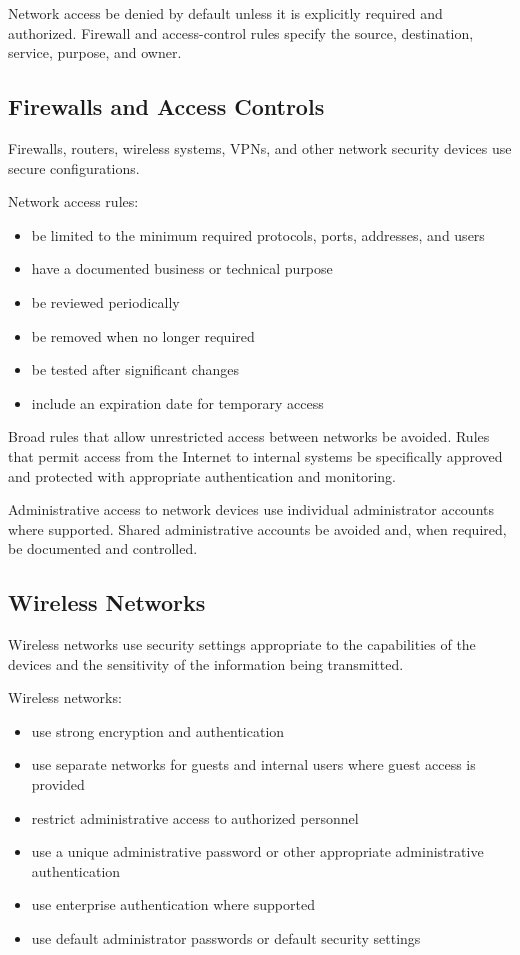 Network access \must{} be denied by default unless it is explicitly required and authorized. Firewall and access-control rules \must{} specify the source, destination, service, purpose, and owner.

\subsection{Firewalls and Access Controls}

Firewalls, routers, wireless systems, VPNs, and other network security devices \must{} use secure configurations.

Network access rules:
\begin{itemize}
    \item \must{} be limited to the minimum required protocols, ports, addresses, and users
    \item \must{} have a documented business or technical purpose
    \item \must{} be reviewed periodically
    \item \must{} be removed when no longer required
    \item \must{} be tested after significant changes
    \item \should{} include an expiration date for temporary access
\end{itemize}

Broad rules that allow unrestricted access between networks \should{} be avoided. Rules that permit access from the Internet to internal systems \must{} be specifically approved and protected with appropriate authentication and monitoring.

Administrative access to network devices \must{} use individual administrator accounts where supported. Shared administrative accounts \should{} be avoided and, when required, \must{} be documented and controlled.

\subsection{Wireless Networks}

Wireless networks \must{} use security settings appropriate to the capabilities of the devices and the sensitivity of the information being transmitted.

Wireless networks:
\begin{itemize}
    \item \must{} use strong encryption and authentication
    \item \must{} use separate networks for guests and internal users where guest access is provided
    \item \must{} restrict administrative access to authorized personnel
    \item \must{} use a unique administrative password or other appropriate administrative authentication
    \item \should{} use enterprise authentication where supported
    \item \mustnot{} use default administrator passwords or default security settings
\end{itemize}


